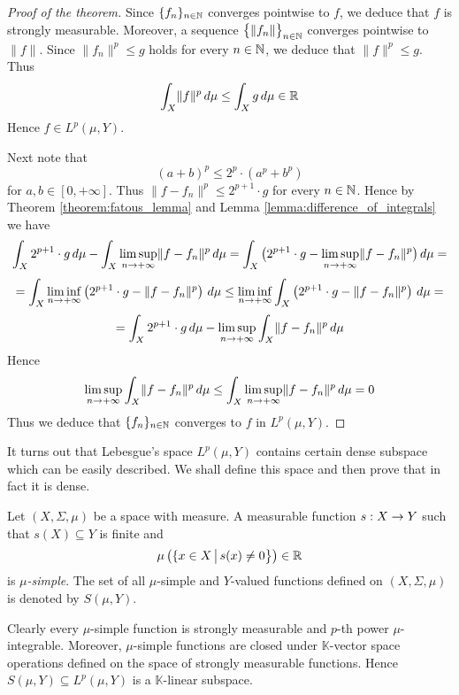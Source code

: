 \documentclass[10pt]{amsart}
\begin{document}
\begin{proof}[Proof of the theorem]
	Since $\{f_n\}_{n\in {\mathbb N}}$ converges pointwise to $f$, we deduce that $f$ is strongly measurable. Moreover, a sequence $\big\{\lVert f_n\rVert\big\}_{n\in {\mathbb N}}$ converges pointwise to $\lVert f\rVert$. Since $\lVert f_n\rVert^p\leq g$ holds for every $n\in {\mathbb N}$, we deduce that $\lVert f\rVert^p \leq g$. Thus
	$$\int_X\lVert f\rVert^p \,d\mu \leq \int_Xg\,d\mu \in {\mathbb R}$$
	Hence $f\in L^p(\mu, Y)$. 

	Next note that 
	$$(a+b)^p \leq 2^p\cdot \left(a^p + b^p\right)$$
	for $a,b \in [0,+\infty]$. Thus $\lVert f - f_n\rVert^p \leq 2^{p + 1}\cdot g$ for every $n\in {\mathbb N}$. Hence by Theorem \ref{theorem:fatous_lemma} and Lemma \ref{lemma:difference_of_integrals} we have
	$$\int_X2^{p + 1}\cdot g\,d\mu - \int_X\limsup_{n\rightarrow +\infty}\lVert f-f_n\rVert^p\,d\mu  = \int_X \big(2^{p + 1}\cdot g - \limsup_{n\rightarrow +\infty}\lVert f-f_n\rVert^p\big)\,d\mu = $$
	$$= \int_X\liminf_{n\rightarrow +\infty}\left(2^{p + 1}\cdot g - \lVert f-f_n\rVert^p\right)\,d\mu \leq \liminf_{n\rightarrow +\infty}\int_X\left(2^{p + 1}\cdot g - \lVert f- f_n\rVert^p\right)\,d\mu =$$
	$$= \int_X 2^{p + 1}\cdot g\,d\mu - \limsup_{n\rightarrow +\infty}\int_X \lVert f-f_n\rVert^p\,d\mu $$
	Hence
	$$\limsup_{n\rightarrow +\infty}\int_X\lVert f - f_n\rVert^p\,d\mu \leq \int_X\limsup_{n\rightarrow +\infty}\lVert f - f_n\rVert^p\,d\mu = 0$$
	Thus we deduce that $\{f_n\}_{n\in {\mathbb N}}$ converges to $f$ in $L^p(\mu,Y)$.
\end{proof}
\noindent
It turns out that Lebesgue's space $L^p(\mu, Y)$ contains certain dense subspace which can be easily described. We shall define this space and then prove that in fact it is dense.

\begin{definition}
	Let $(X,\Sigma, \mu)$ be a space with measure. A measurable function $s:X\rightarrow Y$ such that $s(X)\subseteq Y$ is finite and
	$$\mu\left(\{x\in X\,\big|\,s(x)\neq 0\big\}\right) \in {\mathbb R}$$
	is \textit{$\mu$-simple}. The set of all $\mu$-simple and $Y$-valued functions defined on $(X,\Sigma, \mu)$ is denoted by $S(\mu, Y)$.
\end{definition}
\noindent
Clearly every $\mu$-simple function is strongly measurable and $p$-th power $\mu$-integrable. Moreover, $\mu$-simple functions are closed under $\mathbb{K}$-vector space operations defined on the space of strongly measurable functions. Hence $S(\mu, Y) \subseteq L^p(\mu, Y)$ is a $\mathbb{K}$-linear subspace.
\end{document}
